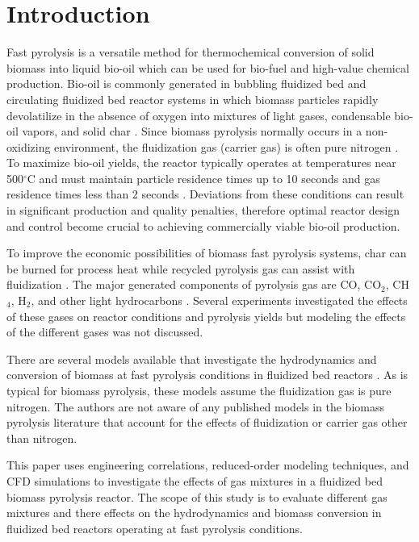 
\section{Introduction}

Fast pyrolysis is a versatile method for thermochemical conversion of solid biomass into liquid bio-oil which can be used for bio-fuel and high-value chemical production. Bio-oil is commonly generated in bubbling fluidized bed and circulating fluidized bed reactor systems in which biomass particles rapidly devolatilize in the absence of oxygen into mixtures of light gases, condensable bio-oil vapors, and solid char \cite{Bridgwater-1999, Bridgwater-2018a, Mohan-2006}. Since biomass pyrolysis normally occurs in a non-oxidizing environment, the fluidization gas (carrier gas) is often pure nitrogen \cite{Mohan-2006}. To maximize bio-oil yields, the reactor typically operates at temperatures near 500$^\circ$C and must maintain particle residence times up to 10 seconds and gas residence times less than 2 seconds \cite{Bridgwater-2018a}. Deviations from these conditions can result in significant production and quality penalties, therefore optimal reactor design and control become crucial to achieving commercially viable bio-oil production.

To improve the economic possibilities of biomass fast pyrolysis systems, char can be burned for process heat while recycled pyrolysis gas can assist with fluidization \cite{Bridgwater-1999, Mante-2012}. The major generated components of pyrolysis gas are CO, CO$_2$, CH$_4$, H$_2$, and other light hydrocarbons \cite{Asadullah-2008, Zhang-2011}. Several experiments investigated the effects of these gases on reactor conditions and pyrolysis yields \cite{Mante-2012, Mullen-2013, Zhang-2011} but modeling the effects of the different gases was not discussed.

There are several models available that investigate the hydrodynamics and conversion of biomass at fast pyrolysis conditions in fluidized bed reactors \cite{Papadikis-2010, Mellin-2014}. As is typical for biomass pyrolysis, these models assume the fluidization gas is pure nitrogen. The authors are not aware of any published models in the biomass pyrolysis literature that account for the effects of fluidization or carrier gas other than nitrogen.

This paper uses engineering correlations, reduced-order modeling techniques, and CFD simulations to investigate the effects of gas mixtures in a fluidized bed biomass pyrolysis reactor. The scope of this study is to evaluate different gas mixtures and there effects on the hydrodynamics and biomass conversion in fluidized bed reactors operating at fast pyrolysis conditions.
